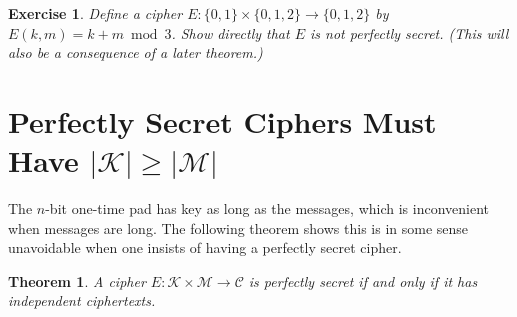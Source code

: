 \documentclass[11pt]{article}
\newtheorem{exercise}{Exercise}
\newtheorem{theorem}{Theorem}
\newcommand{\msgs}{\mathcal{M}}
\newcommand{\ctxts}{\mathcal{C}}
\newcommand{\keys}{\mathcal{K}}
\newcommand{\enc}{E}
\newcommand{\bits}{\{0,1\}}
\begin{document}
\begin{exercise}
    Define a cipher $E:\bits\times\{0,1,2\}\to\{0,1,2\}$ by $E(k,m) = k+m\bmod
    3$. Show directly that $E$ is not perfectly secret. (This will also be a
    consequence of a later theorem.)
\end{exercise}


\iffalse
\section{Perfectly Secret Ciphers Must Have $|\keys| \geq |\msgs|$}

The $n$-bit one-time pad has key as long as the messages, which is inconvenient
when messages are long. The following theorem shows this is in some sense
unavoidable when one insists of having a perfectly secret cipher.
\begin{theorem}
    A cipher $\enc : \keys\times\msgs \to \ctxts$ is perfectly secret
    if and only if it has independent ciphertexts.
\end{theorem}
\end{document}
